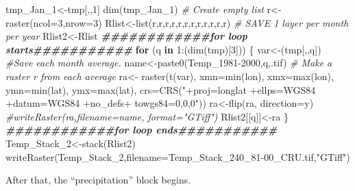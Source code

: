 \documentclass[
  10pt,
  b5paper,
]{book}
\newenvironment{Shaded}{\begin{snugshade}}{\end{snugshade}}
\newcommand{\AttributeTok}[1]{\textcolor[rgb]{0.77,0.63,0.00}{#1}}
\newcommand{\CommentTok}[1]{\textcolor[rgb]{0.56,0.35,0.01}{\textit{#1}}}
\newcommand{\ControlFlowTok}[1]{\textcolor[rgb]{0.13,0.29,0.53}{\textbf{#1}}}
\newcommand{\DecValTok}[1]{\textcolor[rgb]{0.00,0.00,0.81}{#1}}
\newcommand{\DocumentationTok}[1]{\textcolor[rgb]{0.56,0.35,0.01}{\textbf{\textit{#1}}}}
\newcommand{\FunctionTok}[1]{\textcolor[rgb]{0.00,0.00,0.00}{#1}}
\newcommand{\NormalTok}[1]{#1}
\newcommand{\OtherTok}[1]{\textcolor[rgb]{0.56,0.35,0.01}{#1}}
\newcommand{\SpecialCharTok}[1]{\textcolor[rgb]{0.00,0.00,0.00}{#1}}
\newcommand{\StringTok}[1]{\textcolor[rgb]{0.31,0.60,0.02}{#1}}
\begin{document}
\begin{Shaded}
\begin{Highlighting}[]
\NormalTok{tmp\_Jan\_1}\OtherTok{\textless{}{-}}\NormalTok{tmp[,,}\DecValTok{1}\NormalTok{]}
 \FunctionTok{dim}\NormalTok{(tmp\_Jan\_1)}
\CommentTok{\# Create empty list}
\NormalTok{r}\OtherTok{\textless{}{-}}\FunctionTok{raster}\NormalTok{(}\AttributeTok{ncol=}\DecValTok{3}\NormalTok{,}\AttributeTok{nrow=}\DecValTok{3}\NormalTok{)}
\NormalTok{Rlist}\OtherTok{\textless{}{-}}\FunctionTok{list}\NormalTok{(r,r,r,r,r,r,r,r,r,r,r,r)}
 \CommentTok{\# SAVE 1 layer per month per year}
\NormalTok{ Rlist2}\OtherTok{\textless{}{-}}\NormalTok{Rlist}
\DocumentationTok{\#\#\#\#\#\#\#\#\#\#\#\#for loop starts\#\#\#\#\#\#\#\#\#\#\#}
 \ControlFlowTok{for}\NormalTok{ (q }\ControlFlowTok{in} \DecValTok{1}\SpecialCharTok{:}\NormalTok{(}\FunctionTok{dim}\NormalTok{(tmp)[}\DecValTok{3}\NormalTok{])) \{}
\NormalTok{var}\OtherTok{\textless{}{-}}\NormalTok{(tmp[,,q])}
 \CommentTok{\#Save each month average. }
\NormalTok{ name}\OtherTok{\textless{}{-}}\FunctionTok{paste0}\NormalTok{(}\StringTok{\textquotesingle{}Temp\_1981{-}2000\textquotesingle{}}\NormalTok{,q,}\StringTok{\textquotesingle{}.tif\textquotesingle{}}\NormalTok{)}
 \CommentTok{\# Make a raster r from each average}
\NormalTok{ra}\OtherTok{\textless{}{-}} \FunctionTok{raster}\NormalTok{(}\FunctionTok{t}\NormalTok{(var), }\AttributeTok{xmn=}\FunctionTok{min}\NormalTok{(lon), }\AttributeTok{xmx=}\FunctionTok{max}\NormalTok{(lon), }\AttributeTok{ymn=}\FunctionTok{min}\NormalTok{(lat), }\AttributeTok{ymx=}\FunctionTok{max}\NormalTok{(lat), }\AttributeTok{crs=}\FunctionTok{CRS}\NormalTok{(}\StringTok{"+proj=longlat +ellps=WGS84 +datum=WGS84 +no\_defs+ towgs84=0,0,0"}\NormalTok{))}
\NormalTok{ra}\OtherTok{\textless{}{-}}\FunctionTok{flip}\NormalTok{(ra, }\AttributeTok{direction=}\StringTok{\textquotesingle{}y\textquotesingle{}}\NormalTok{)}
\CommentTok{\#writeRaster(ra,filename=name, format="GTiff")}
\NormalTok{Rlist2[[q]]}\OtherTok{\textless{}{-}}\NormalTok{ra}
\NormalTok{\}}
\DocumentationTok{\#\#\#\#\#\#\#\#\#\#\#\#for loop ends\#\#\#\#\#\#\#\#\#\#\#}
\NormalTok{Temp\_Stack\_2}\OtherTok{\textless{}{-}}\FunctionTok{stack}\NormalTok{(Rlist2)}
\FunctionTok{writeRaster}\NormalTok{(Temp\_Stack\_2,}\AttributeTok{filename=}\StringTok{\textquotesingle{}Temp\_Stack\_240\_81{-}00\_CRU.tif\textquotesingle{}}\NormalTok{,}\StringTok{"GTiff"}\NormalTok{)}
\end{Highlighting}
\end{Shaded}

After that, the ``precipitation'' block begins.
\end{document}
